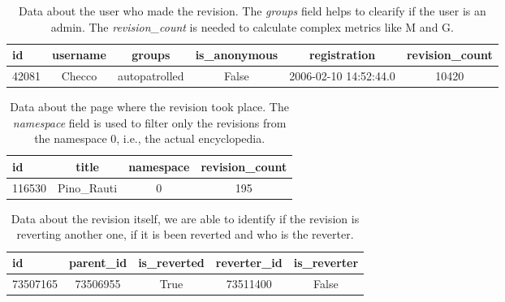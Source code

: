 \begin{table}[H]
    \centering
    \begin{tabularx}{\columnwidth}{@{}Xccccc@{}}
        \midrule
        \textbf{id} & \textbf{username} & \textbf{groups} & \textbf{is\_anonymous} & \textbf{registration} & \textbf{revision\_count}\\ \toprule
        42081 & Checco & autopatrolled & False & 2006-02-10 14:52:44.0 & 10420 \\

         \bottomrule
    \end{tabularx}
    
    \caption{Data about the user who made the revision. The \textit{groups} field helps to
     clearify if the user is an admin. The \textit{revision\_count} is needed to calculate complex metrics like M and G. \label{table:user}}
\end{table}


\begin{table}[H]
    \centering
    \begin{tabularx}{\columnwidth}{@{}Xccc@{}}
        \midrule
        \textbf{id} & \textbf{title} & \textbf{namespace} & \textbf{revision\_count} \\ \toprule
        116530 & Pino\_Rauti & 0 &  195 
        \\

         \bottomrule
    \end{tabularx}
    
    \caption{Data about the page where the revision took place. The \textit{namespace} field is used
    to filter only the revisions from the namespace 0, i.e., the actual encyclopedia. \label{table:page}}
\end{table}

\begin{table}[H]
    \centering
    \begin{tabularx}{\columnwidth}{@{}Xcccc@{}}
        \midrule
        \textbf{id} & \textbf{parent\_id} & \textbf{is\_reverted} & \textbf{reverter\_id} & \textbf{is\_reverter} \\ \toprule
        73507165 & 73506955 & True &  73511400 & False 
        \\

         \bottomrule
    \end{tabularx}
    
    \caption{Data about the revision itself, we are able to identify if the revision is reverting another
    one, if it is been reverted and who is the reverter. \label{table:revision} }
\end{table}



